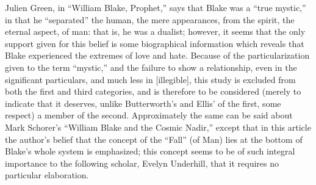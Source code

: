 Julien Green, in \enquote{William Blake, Prophet,}\supercite{green:blake-prophet}
says that Blake was a \enquote{true mystic,} in that he \enquote{separated} the human,
the mere appearances, from the spirit, the eternal aspect, of man:
that is, he was a dualist; however, it seems that the only support given for this belief is some
biographical information which reveals that Blake experienced the extremes of love and hate. Because of the particularization given to the term \enquote{mystic,} and the failure to show a relationship,
even in the significant particulars, and much less in [illegible], this study is excluded from both the first
and third categories, and is therefore to be considered (merely to indicate that it deserves, unlike Butterworth's and Ellis' of
the first, some respect) a member of the second. Approximately the same can be said about Mark Schorer's \enquote{William Blake and
the Cosmic Nadir,}\supercite{schorer:cosmic-nadir}
except that in this article the author's belief that the concept of the \enquote{Fall} (of Man) lies
at the bottom of Blake's whole system is emphasized; this concept seems to be of such integral importance to the following
scholar, Evelyn Underhill, that it requires no particular elaboration.

\clearpage

\label{self:07}

